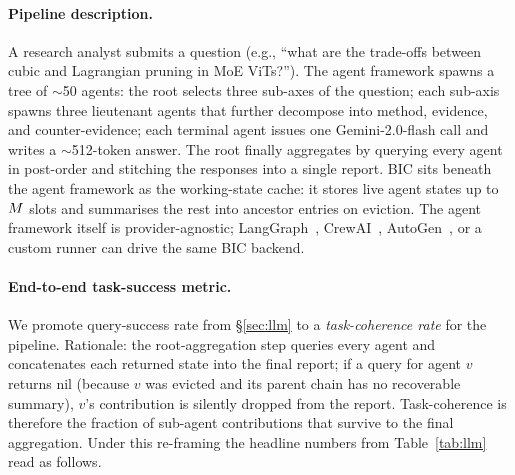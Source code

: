 \paragraph{Pipeline description.}
A research analyst submits a question (e.g., ``what are the trade-offs
between cubic and Lagrangian pruning in MoE ViTs?'').  The agent
framework spawns a tree of $\sim$50 agents: the root selects three
sub-axes of the question; each sub-axis spawns three lieutenant agents
that further decompose into method, evidence, and counter-evidence;
each terminal agent issues one Gemini-2.0-flash call and writes a
$\sim$512-token answer.  The root finally aggregates by querying
every agent in post-order and stitching the responses into a single
report.  BIC sits beneath the agent framework as the working-state
cache: it stores live agent states up to $M$ slots and summarises
the rest into ancestor entries on eviction.  The agent framework
itself is provider-agnostic; LangGraph~\citep{langgraph2024},
CrewAI~\citep{crewai2024}, AutoGen~\citep{wu2023autogen}, or a custom
runner can drive the same BIC backend.

\paragraph{End-to-end task-success metric.}
We promote query-success rate from \S\ref{sec:llm} to a
\emph{task-coherence rate} for the pipeline.  Rationale: the
root-aggregation step queries every agent and concatenates each
returned state into the final report; if a query for agent $v$
returns nil (because $v$ was evicted and its parent chain has no
recoverable summary), $v$'s contribution is silently dropped from
the report.  Task-coherence is therefore the fraction of sub-agent
contributions that survive to the final aggregation.  Under this
re-framing the headline numbers from Table~\ref{tab:llm} read as
follows.

